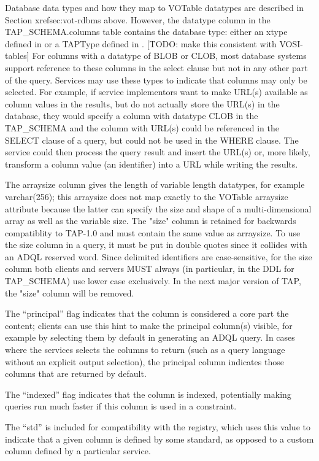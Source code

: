 \documentclass[11pt,letter]{ivoa}
\begin{document}
Database data types and how they map to VOTable datatypes are described in Section 
xref{sec:vot-rdbms} above. However, the datatype column in the TAP\_SCHEMA.columns
table contains the database type: either an xtype defined in \citep{std:DALI} or a
TAPType defined in \citep{std:VODS11}. [TODO: make this consistent with VOSI-tables]
For columns with a datatype of BLOB or CLOB, most database systems support reference to 
these columns in the select clause but not in any other part of the query. 
Services may use these types to indicate that columns may only be selected. For 
example, if service implementors want to make URL(s) available as column values 
in the results, but do not actually store the URL(s) in the database, they would 
specify a column with datatype CLOB in the TAP\_SCHEMA and the column with URL(s) could be 
referenced in the SELECT clause of a query, but could not be used in the WHERE 
clause. The service could then process the query result and insert the URL(s) 
or, more likely, transform a column value (an identifier) into a URL while 
writing the results.

The arraysize column gives the length of variable length datatypes, for example 
varchar(256); this arraysize does not map exactly to the VOTable arraysize attribute 
because the latter can specify the size and shape of a multi-dimensional array as well 
as the variable size. The "size" column is retained for backwards compatiblity 
to TAP-1.0 and must contain the same value as arraysize. To use the size column in a 
query, it must be put in double quotes since it collides with an ADQL reserved 
word. Since delimited identifiers are case-sensitive, for the size column both 
clients and servers MUST always (in particular, in the DDL for 
TAP\_SCHEMA) use lower case exclusively. In the next major version 
of TAP, the "size" column will be removed.

The “principal” flag indicates that the column is considered a core part the 
content; clients can use this hint to make the principal column(s) visible, for 
example by selecting them by default in generating an ADQL query. In cases where 
the services selects the columns to return (such as a query language without an 
explicit output selection), the principal column indicates those columns that 
are returned by default. 

The “indexed” flag indicates that the column is indexed, potentially 
making queries run much faster if this column is used in a constraint. 

The “std” is included for compatibility with the registry, which uses this value 
to indicate that a given column is defined by some standard, as opposed to a 
custom column defined by a particular service.
\end{document}
